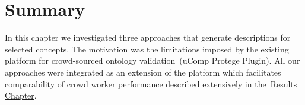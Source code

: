 \section{Summary}\label{sec:approaches_summary}
In this chapter we investigated three approaches that generate descriptions for selected concepts. The motivation was 
the limitations imposed by the existing platform for crowd-sourced ontology validation~(uComp Protege Plugin). All our approaches
were integrated as an extension of the platform which facilitates comparability of crowd worker performance described extensively in
the~\hyperref[chap:results]{Results Chapter}. 



